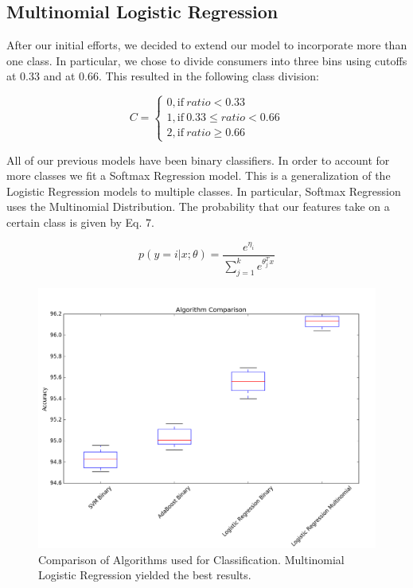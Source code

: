 \documentclass[conference]{IEEEtran}
\begin{document}
\subsection{Multinomial Logistic Regression}
After our initial efforts, we decided to extend our model to incorporate more than one class. In particular, we chose to divide consumers into three bins using cutoffs at 0.33 and at 0.66. This resulted in the following class division:

\begin{equation}
C=
\begin{cases}
0, \text{if}\ ratio < 0.33 \\
1, \text{if}\ 0.33 \leq ratio < 0.66 \\
2, \text{if}\ ratio \geq 0.66
\end{cases}
\end{equation}

All of our previous models have been binary classifiers. In order to account for more classes we fit a Softmax Regression model. This is a generalization of the Logistic Regression models to multiple classes. In particular, Softmax Regression uses the Multinomial Distribution. The probability that our features take on a certain class is given by Eq. 7.

\begin{equation}
p(y = i | x;\theta) = \frac{e^{\eta_i}}{\sum_{j=1}^{k} e^{\theta_j^Tx}}
\end{equation}

\begin{figure}[t]
\centering
        \includegraphics[totalheight=6cm]{algorithm-comparison}
    \caption{Comparison of Algorithms used for Classification. Multinomial Logistic Regression yielded the best results.}
    \label{fig:verticalcell}
\end{figure}
\end{document}
